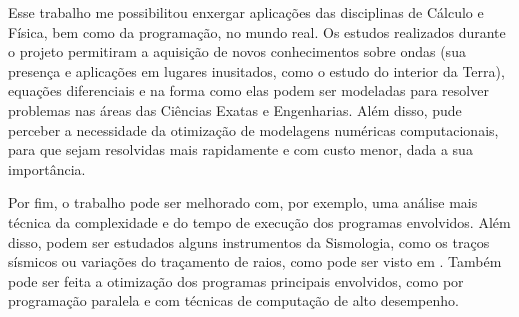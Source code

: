     Esse trabalho me possibilitou enxergar aplicações das disciplinas de Cálculo e Física, bem como da programação, no mundo real. Os estudos realizados durante o projeto permitiram a aquisição de novos conhecimentos sobre ondas (sua presença e aplicações em lugares inusitados, como o estudo do interior da Terra), equações diferenciais e na forma como elas podem ser modeladas para resolver problemas nas áreas das Ciências Exatas e Engenharias. Além disso, pude perceber a necessidade da otimização de modelagens numéricas computacionais, para que sejam resolvidas mais rapidamente e com custo menor, dada a sua importância.
    
    Por fim, o trabalho pode ser melhorado com, por exemplo, uma análise mais técnica da complexidade e do tempo de execução dos programas envolvidos. Além disso, podem ser estudados alguns instrumentos da Sismologia, como os traços sísmicos ou variações do traçamento de raios, como pode ser visto em \cite{Miqueles2006}. Também pode ser feita a otimização dos programas principais envolvidos, como por programação paralela e com técnicas de computação de alto desempenho.